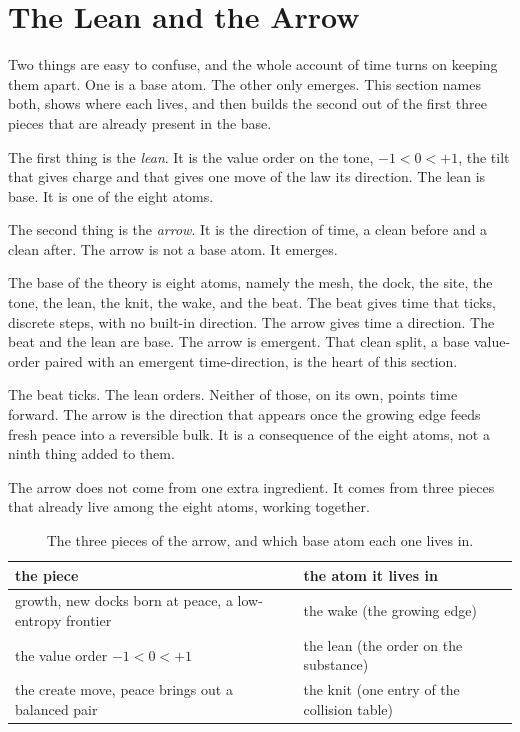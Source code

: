 \section{The Lean and the Arrow}

Two things are easy to confuse, and the whole account of time turns on keeping them apart. One is a base atom. The other only emerges. This section names both, shows where each lives, and then builds the second out of the first three pieces that are already present in the base.

The first thing is the \emph{lean}. It is the value order on the tone, $-1 < 0 < +1$, the tilt that gives charge and that gives one move of the law its direction. The lean is base. It is one of the eight atoms.

The second thing is the \emph{arrow}. It is the direction of time, a clean before and a clean after. The arrow is not a base atom. It emerges.

The base of the theory is eight atoms, namely the mesh, the dock, the site, the tone, the lean, the knit, the wake, and the beat. The beat gives time that ticks, discrete steps, with no built-in direction. The arrow gives time a direction. The beat and the lean are base. The arrow is emergent. That clean split, a base value-order paired with an emergent time-direction, is the heart of this section.

\begin{principle}
The beat ticks. The lean orders. Neither of those, on its own, points time forward. The arrow is the direction that appears once the growing edge feeds fresh peace into a reversible bulk. It is a consequence of the eight atoms, not a ninth thing added to them.
\end{principle}

The arrow does not come from one extra ingredient. It comes from three pieces that already live among the eight atoms, working together.

\begin{table}[ht]
\centering
\begin{tabular}{@{}ll@{}}
\toprule
the piece & the atom it lives in \\
\midrule
growth, new docks born at peace, a low-entropy frontier & the wake (the growing edge) \\
the value order $-1 < 0 < +1$ & the lean (the order on the substance) \\
the create move, peace brings out a balanced pair & the knit (one entry of the collision table) \\
\bottomrule
\end{tabular}
\caption{The three pieces of the arrow, and which base atom each one lives in.}
\label{tab:arrow-pieces}
\end{table}

